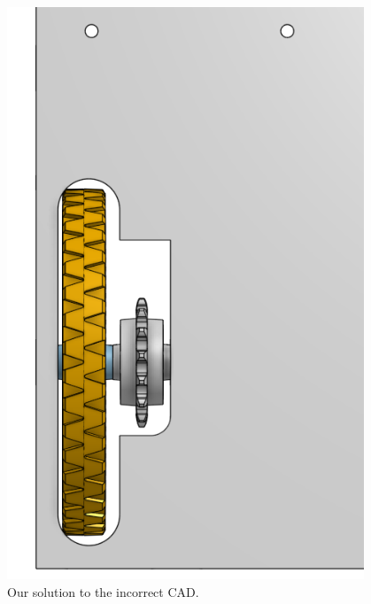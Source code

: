 \begin{figure}[htp]
\centering
\includegraphics[width=0.95\textwidth, angle=0]{Meetings/October/10-16-21/10-16-21_Hardware_Figure2 - Nathan Forrer.PNG}
\caption{Our solution to the incorrect CAD.}
\label{fig:pic1}
\end{figure}


